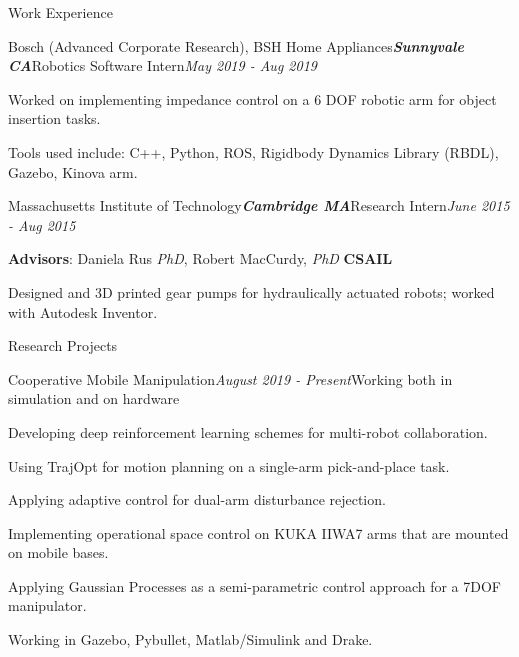 \documentclass{resume} %
\begin{document}
\begin{rSection}{Work Experience}
\begin{rSubsection}{Bosch (Advanced Corporate Research), BSH Home Appliances}{\bf \em Sunnyvale CA}{Robotics Software Intern}{\em May 2019 - Aug 2019}
\item Worked on implementing impedance control on a 6 DOF robotic arm for object insertion tasks.
\item Tools used include: C++, Python, ROS, Rigidbody Dynamics Library (RBDL), Gazebo, Kinova arm.
\end{rSubsection}

\begin{rSubsection}{Massachusetts Institute of Technology}{\bf \em Cambridge MA}{Research Intern}{\em June 2015 - Aug 2015}
\item {\bf Advisors}: Daniela Rus {\em PhD},   Robert MacCurdy, {\em PhD} \hfill {\bf CSAIL}
\item Designed and 3D printed gear pumps for hydraulically actuated robots; worked with Autodesk Inventor.

\end{rSubsection}

\end{rSection}



\begin{rSection}{Research Projects}

\begin{rSubsection}{Cooperative Mobile Manipulation}{\em August 2019 - Present}{Working both in simulation and on hardware}{}
\item Developing deep reinforcement learning schemes for multi-robot collaboration.
\item Using TrajOpt for motion planning on a single-arm pick-and-place task.
\item Applying adaptive control for dual-arm disturbance rejection.
\item Implementing operational space control on KUKA IIWA7 arms that are mounted on mobile bases.
\item Applying Gaussian Processes as a semi-parametric control approach for a 7DOF manipulator.
\item Working in Gazebo, Pybullet, Matlab/Simulink and Drake.
\end{rSubsection}

\end{rSection}
\end{document}
